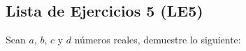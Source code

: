 \documentclass[11pt]{article}
\newcommand{\R}{\mathbb{R}}
\newcommand{\bfit}[1]{\textbf{\textit{#1}}}
\begin{document}
\subsection*{Lista de Ejercicios 5 (LE5)}
Sean $a$, $b$, $c$ y $d$ números reales, demuestre lo siguiente:
\begin{enumerate}[label=\alph*)]
%

\end{enumerate}
\end{document}
